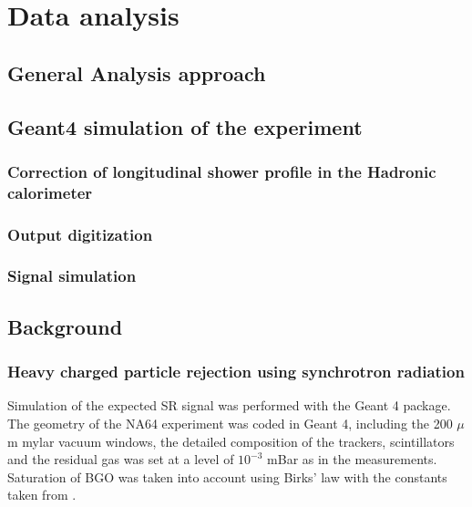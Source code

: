 
\newcommand{\plotdir}{chapters/chapter3/plots}

\chapter{Data analysis} %
\label{chapter3} %


\section{General Analysis approach}
\label{chapter3:sec:analysis-approach}

\section{Geant4 simulation of the experiment}
\label{chapter3:sec:geant4}

\subsection{Correction of longitudinal shower profile in the Hadronic calorimeter}
\label{chapter3:sec:geant4-hcal-corr}

\subsection{Output digitization}
\label{chapter3:sec:geant4-digitization}

\subsection{Signal simulation}
\label{chapter3:sec:geant4-signal}

\section{Background}
\label{chapter3:sec:bkg}

\subsection{Heavy charged particle rejection using synchrotron radiation}
\label{chapter3:sec:bkg-srd}

Simulation of the expected SR signal was performed with the Geant 4 package\cite{ALLISON2016186,1610988,AGOSTINELLI2003250}.
The geometry of the NA64 experiment was coded in Geant 4, including the 200 $\mu$m mylar vacuum windows, the detailed composition of the trackers, scintillators and the residual gas was set at a level of $10^{-3}$ mBar as in the measurements. Saturation of BGO was taken into account using Birks' law with the constants taken from \cite{AVDEICHIKOV2002251}.

